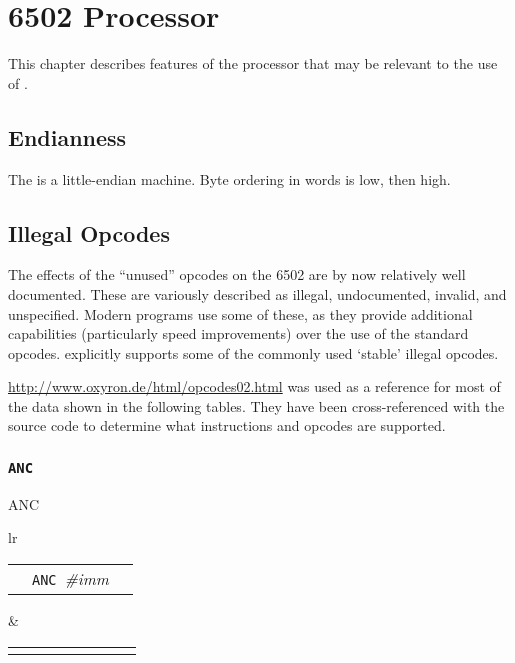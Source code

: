\label{changelog20200901_nop3}

\chapter{6502 Processor}
\label{processor:6502}


This chapter describes features of the  processor that may be relevant to the use of \dasm.

\section{Endianness}

The  is a little-endian machine. Byte ordering in words is low, then high.

\label{changelog:20200904illegal}
\section{Illegal Opcodes}

The effects of the ``unused'' opcodes on the 6502 are by now relatively well documented. These are variously described as illegal, undocumented, invalid, and unspecified. Modern programs use some of these, as they provide additional capabilities (particularly speed improvements) over the use of the standard opcodes. \dasm explicitly supports some of the commonly used `stable' illegal opcodes.

\url{http://www.oxyron.de/html/opcodes02.html} was used as a reference for most of the data shown in the following tables. They have been cross-referenced with the \dasm source code to determine what instructions and opcodes are supported.

\iffalse
\subsection{\texttt{ANC}}
\begin{usage}
 ANC 
\end{usage}

\begin{table}[H]
\begin{tabular}{lr}

\begin{tabular}{llc}

\mono{\$0B}&\texttt{ANC }\emph{\#imm}&\mono{A:=A \& \#\{imm\}}\\

\end{tabular}&

\tabcolsep=0.1cm
\begin{tabular}{|cccccccc|}
\hline
\scriptsize\mono{N}&
\scriptsize\mono{V}&
\scriptsize\mono{B}&
\scriptsize\mono{D}&
\scriptsize\mono{I}&
\scriptsize\mono{Z}&
\scriptsize\mono{C}&
\scriptsize\mono{?}\\
\hline
\mono{1}&
\mono{*}&
\mono{*}&
\mono{*}&
\mono{*}&
\mono{*}&
\mono{*}&
\mono{*}\\
\hline

\end{tabular}
\end{tabular}
\end{table}


